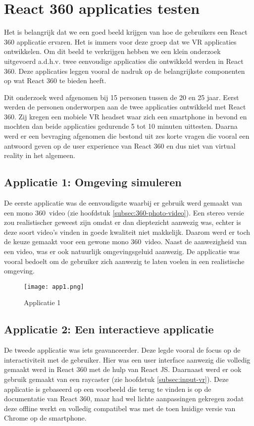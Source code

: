 \chapter{React 360 applicaties testen}
\label{ch:react-360-apps}
Het is belangrijk dat we een goed beeld krijgen van hoe de gebruikers een React 360 applicatie ervaren. Het is immers voor deze groep dat we VR applicaties ontwikkelen. Om dit beeld te verkrijgen hebben we een klein onderzoek uitgevoerd a.d.h.v. twee eenvoudige applicaties die ontwikkeld werden in React 360. Deze applicaties leggen vooral de nadruk op de belangrijkste componenten op wat React 360 te bieden heeft. 

Dit onderzoek werd afgenomen bij 15 personen tussen de 20 en 25 jaar. Eerst werden de personen onderworpen aan de twee applicaties ontwikkeld met React 360. Zij kregen een mobiele VR headset waar zich een smartphone in bevond en mochten dan beide applicaties gedurende 5 tot 10 minuten uittesten. Daarna werd er een bevraging afgenomen die bestond uit zes korte vragen die vooral een antwoord geven op de user experience van React 360 en dus niet van virtual reality in het algemeen.

\section{Applicatie 1: Omgeving simuleren}
\label{sec:omgeving-simulatie}
De eerste applicatie was de eenvoudigste waarbij er gebruik werd gemaakt van een mono 360\textdegree\ video (zie hoofdstuk \ref{subsec:360-photo-video}). Een stereo versie zou realistischer geweest zijn omdat er dan dieptezicht aanwezig was, echter is deze soort video's vinden in goede kwaliteit niet makkelijk. Daarom werd er toch de keuze gemaakt voor een gewone mono 360\textdegree\ video. Naast de aanwezigheid van een video, was er ook natuurlijk omgevingsgeluid aanwezig. De applicatie was vooral bedoelt om de gebruiker zich aanwezig te laten voelen in een realistische omgeving.

\begin{figure}[H]
	\centering
	\texttt{[image: app1.png]}
	\caption{Applicatie 1}
	\label{fig:app1}
\end{figure}

\section{Applicatie 2: Een interactieve applicatie}
\label{sec:interactieve-applicatie}
De tweede applicatie was iets geavanceerder. Deze legde vooral de focus op de interactiviteit met de gebruiker. Hier was een user interface aanwezig die volledig gemaakt werd in React 360 met de hulp van React JS. Daarnaast werd er ook gebruik gemaakt van een raycaster (zie hoofdstuk \ref{subsec:input-vr}). Deze applicatie is gebaseerd op een voorbeeld die terug te vinden is op de documentatie van React 360, maar had wel lichte aanpassingen gekregen zodat deze offline werkt en volledig compatibel was met de toen huidige versie van Chrome op de smartphone.

